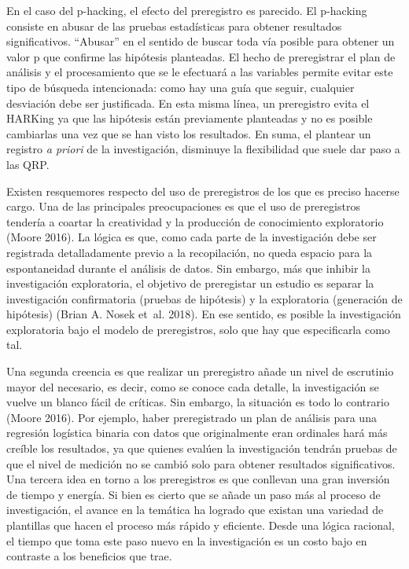 \documentclass[
  spanish,
  letterpaper,
  DIV=11,
  numbers=noendperiod]{scrreprt}
\begin{document}
En el caso del p-hacking, el efecto del preregistro es parecido. El
p-hacking consiste en abusar de las pruebas estadísticas para obtener
resultados significativos. ``Abusar'' en el sentido de buscar toda vía
posible para obtener un valor p que confirme las hipótesis planteadas.
El hecho de preregistrar el plan de análisis y el procesamiento que se
le efectuará a las variables permite evitar este tipo de búsqueda
intencionada: como hay una guía que seguir, cualquier desviación debe
ser justificada. En esta misma línea, un preregistro evita el HARKing ya
que las hipótesis están previamente planteadas y no es posible
cambiarlas una vez que se han visto los resultados. En suma, el plantear
un registro \emph{a priori} de la investigación, disminuye la
flexibilidad que suele dar paso a las QRP.

Existen resquemores respecto del uso de preregistros de los que es
preciso hacerse cargo. Una de las principales preocupaciones es que el
uso de preregistros tendería a coartar la creatividad y la producción de
conocimiento exploratorio (Moore 2016). La lógica es que, como cada
parte de la investigación debe ser registrada detalladamente previo a la
recopilación, no queda espacio para la espontaneidad durante el análisis
de datos. Sin embargo, más que inhibir la investigación exploratoria, el
objetivo de preregistar un estudio es separar la investigación
confirmatoria (pruebas de hipótesis) y la exploratoria (generación de
hipótesis) (Brian A. Nosek et~al. 2018). En ese sentido, es posible la
investigación exploratoria bajo el modelo de preregistros, solo que hay
que especificarla como tal.

Una segunda creencia es que realizar un preregistro añade un nivel de
escrutinio mayor del necesario, es decir, como se conoce cada detalle,
la investigación se vuelve un blanco fácil de críticas. Sin embargo, la
situación es todo lo contrario (Moore 2016). Por ejemplo, haber
preregistrado un plan de análisis para una regresión logística binaria
con datos que originalmente eran ordinales hará más creíble los
resultados, ya que quienes evalúen la investigación tendrán pruebas de
que el nivel de medición no se cambió solo para obtener resultados
significativos. Una tercera idea en torno a los preregistros es que
conllevan una gran inversión de tiempo y energía. Si bien es cierto que
se añade un paso más al proceso de investigación, el avance en la
temática ha logrado que existan una variedad de plantillas que hacen el
proceso más rápido y eficiente. Desde una lógica racional, el tiempo que
toma este paso nuevo en la investigación es un costo bajo en contraste a
los beneficios que trae.
\end{document}
